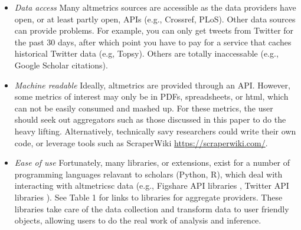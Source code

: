 \documentclass[letterpaper,superscriptaddress,showkeys,longbibliography]{revtex4-1}\usepackage{graphicx, color}
\begin{document}
\begin{itemize}
  \item \emph{Data access} Many altmetrics sources are accessible as the data providers have open, or at least partly open, APIs (e.g., Crossref, PLoS). Other data sources can provide problems. For example, you can only get tweets from Twitter for the past 30 days, after which point you have to pay for a service that caches historical Twitter data (e.g, Topsy). Others are totally inaccessable (e.g., Google Scholar citations). 
  \item \emph{Machine readable} Ideally, altmetrics are provided through an API. However, some metrics of interest may only be in PDFs, spreadsheets, or html, which can not be easily consumed and mashed up. For these metrics, the user should seek out aggregators such as those discussed in this paper to do the heavy lifting. Alternatively, technically savy researchers could write their own code, or leverage tools such as ScraperWiki \url{https://scraperwiki.com/}. 
  \item \emph{Ease of use} Fortunately, many libraries, or extensions, exist for a number of programming languages relavant to scholars (Python, R), which deal with interacting with altmetricsc data (e.g., Figshare API libraries \cite{figshare}, Twitter API libraries \cite{twitter}). See Table 1 for links to libraries for aggregate providers. These libraries take care of the data collection and transform data to user friendly objects, allowing users to do the real work of analysis and inference.
\end{itemize}

\end{document}

